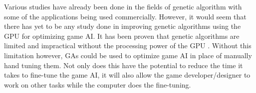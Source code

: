 

Various studies have already been done in the fields of genetic algorithm with
some of the applications being used commercially. However, it would seem that there
has yet to be any study done in improving genetic algorithms using the GPU for optimizing
game AI. It has been proven that genetic algorithms are limited and impractical without
the processing power of the GPU \cite{Banzhaf09}. Without this limitation however, GAs
could be used to optimize game AI in place of manually hand tuning them. Not only does
this have the potential to reduce the time it takes to fine-tune the game AI, it will
also allow the game developer/designer to work on other tasks while the computer
does the fine-tuning.